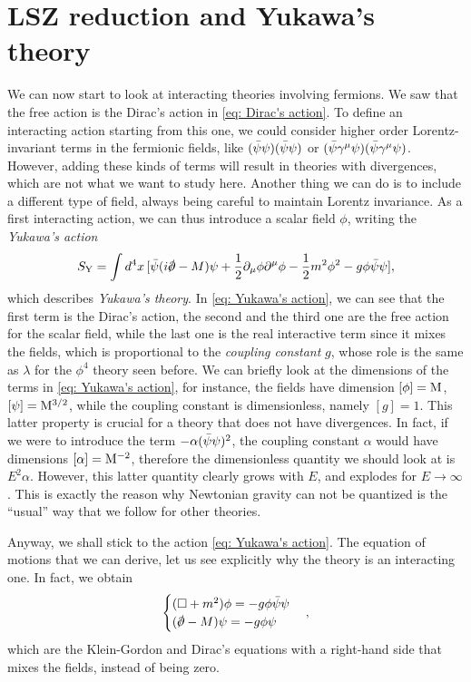 \chapter{LSZ reduction and Yukawa's theory}
We can now start to look at interacting theories involving fermions. We saw that the free action is the Dirac's action in \eqref{eq: Dirac's action}. To define an interacting action starting from this one, we could consider higher order Lorentz-invariant terms in the fermionic fields, like $(\bar{\psi}\psi)(\bar{\psi}\psi)$ or $(\bar{\psi}\gamma^\mu\psi)(\bar{\psi}\gamma^\mu\psi)$. However, adding these kinds of terms will result in theories with divergences, which are not what we want to study here. Another thing we can do is to include a different type of field, always being careful to maintain Lorentz invariance. As a first interacting action, we can thus introduce a scalar field $\phi$, writing the \emph{Yukawa's action} 
\begin{equation}
\label{eq: Yukawa's action}
    S_{\rem{Y}} = \int d^4x\,[\b{\psi}(i\sl{\p} - M)\psi + \frac{1}{2}\p_\mu\phi\p^\mu\phi - \frac{1}{2}m^2\phi^2 - g\phi\b{\psi}\psi],
\end{equation}
which describes \emph{Yukawa's theory}. In \eqref{eq: Yukawa's action}, we can see that the first term is the Dirac's action, the second and the third one are the free action for the scalar field, while the last one is the real interactive term since it mixes the fields, which is proportional to the \emph{coupling constant} $g$, whose role is the same as $\lambda$ for the $\phi^4$ theory seen before. We can briefly look at the dimensions of the terms in \eqref{eq: Yukawa's action}, for instance, the fields have dimension $[\phi] = \mathrm{M}$, $[\psi] = \mathrm{M}^{3/2}$, while the coupling constant is dimensionless, namely $[g] = 1$. This latter property is crucial for a theory that does not have divergences. In fact, if we were to introduce the term $-\alpha(\bar{\psi}\psi)^2$, the coupling constant $\alpha$ would have dimensions $[\alpha] = \mathrm{M}^{-2}$, therefore the dimensionless quantity we should look at is $E^2\alpha$. However, this latter quantity clearly grows with $E$, and explodes for $E \to \infty$. This is exactly the reason why Newtonian gravity can not be quantized is the ``usual'' way that we follow for other theories. 

Anyway, we shall stick to the action \eqref{eq: Yukawa's action}. The equation of motions that we can derive, let us see explicitly why the theory is an interacting one. In fact, we obtain 
\begin{equation}
    \begin{cases}
        (\square + m^2)\phi = -g\phi\b{\psi}\psi \\
        (\sl{\p} - M)\psi = -g\phi\psi
    \end{cases},
\end{equation}
which are the Klein-Gordon and Dirac's equations with a right-hand side that mixes the fields, instead of being zero. 

